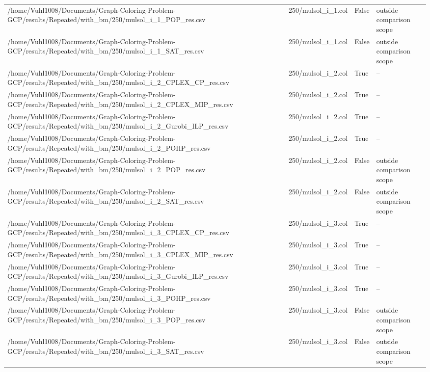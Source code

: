 \begin{table}[htbp]
\begin{tabular}{llll}
/home/Vuhl1008/Documents/Graph-Coloring-Problem-GCP/results/Repeated/with\_bm/250/mulsol\_i\_1\_POP\_res.csv & 250/mulsol\_i\_1.col & False & outside comparison scope \\
/home/Vuhl1008/Documents/Graph-Coloring-Problem-GCP/results/Repeated/with\_bm/250/mulsol\_i\_1\_SAT\_res.csv & 250/mulsol\_i\_1.col & False & outside comparison scope \\
/home/Vuhl1008/Documents/Graph-Coloring-Problem-GCP/results/Repeated/with\_bm/250/mulsol\_i\_2\_CPLEX\_CP\_res.csv & 250/mulsol\_i\_2.col & True & -- \\
/home/Vuhl1008/Documents/Graph-Coloring-Problem-GCP/results/Repeated/with\_bm/250/mulsol\_i\_2\_CPLEX\_MIP\_res.csv & 250/mulsol\_i\_2.col & True & -- \\
/home/Vuhl1008/Documents/Graph-Coloring-Problem-GCP/results/Repeated/with\_bm/250/mulsol\_i\_2\_Gurobi\_ILP\_res.csv & 250/mulsol\_i\_2.col & True & -- \\
/home/Vuhl1008/Documents/Graph-Coloring-Problem-GCP/results/Repeated/with\_bm/250/mulsol\_i\_2\_POHP\_res.csv & 250/mulsol\_i\_2.col & True & -- \\
/home/Vuhl1008/Documents/Graph-Coloring-Problem-GCP/results/Repeated/with\_bm/250/mulsol\_i\_2\_POP\_res.csv & 250/mulsol\_i\_2.col & False & outside comparison scope \\
/home/Vuhl1008/Documents/Graph-Coloring-Problem-GCP/results/Repeated/with\_bm/250/mulsol\_i\_2\_SAT\_res.csv & 250/mulsol\_i\_2.col & False & outside comparison scope \\
/home/Vuhl1008/Documents/Graph-Coloring-Problem-GCP/results/Repeated/with\_bm/250/mulsol\_i\_3\_CPLEX\_CP\_res.csv & 250/mulsol\_i\_3.col & True & -- \\
/home/Vuhl1008/Documents/Graph-Coloring-Problem-GCP/results/Repeated/with\_bm/250/mulsol\_i\_3\_CPLEX\_MIP\_res.csv & 250/mulsol\_i\_3.col & True & -- \\
/home/Vuhl1008/Documents/Graph-Coloring-Problem-GCP/results/Repeated/with\_bm/250/mulsol\_i\_3\_Gurobi\_ILP\_res.csv & 250/mulsol\_i\_3.col & True & -- \\
/home/Vuhl1008/Documents/Graph-Coloring-Problem-GCP/results/Repeated/with\_bm/250/mulsol\_i\_3\_POHP\_res.csv & 250/mulsol\_i\_3.col & True & -- \\
/home/Vuhl1008/Documents/Graph-Coloring-Problem-GCP/results/Repeated/with\_bm/250/mulsol\_i\_3\_POP\_res.csv & 250/mulsol\_i\_3.col & False & outside comparison scope \\
/home/Vuhl1008/Documents/Graph-Coloring-Problem-GCP/results/Repeated/with\_bm/250/mulsol\_i\_3\_SAT\_res.csv & 250/mulsol\_i\_3.col & False & outside comparison scope \\

\end{tabular}
\end{table}
